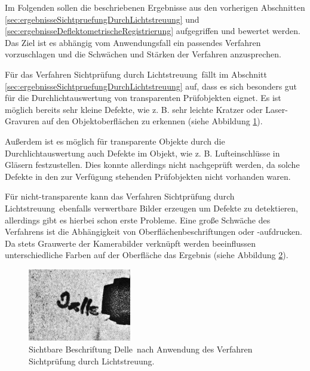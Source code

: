 Im Folgenden sollen die beschriebenen Ergebnisse aus den vorherigen Abschnitten \ref{sec:ergebnisseSichtpruefungDurchLichtstreuung} und \ref{sec:ergebnisseDeflektometrischeRegistrierung} aufgegriffen und bewertet werden.
Das Ziel ist es abhängig vom Anwendungsfall ein passendes Verfahren vorzuschlagen und die Schwächen und Stärken der Verfahren anzusprechen.

\p
Für das Verfahren \glqq Sichtprüfung durch Lichtstreuung\grqq ~fällt im Abschnitt \ref{sec:ergebnisseSichtpruefungDurchLichtstreuung} auf, dass es sich besonders gut für die Durchlichtauswertung von transparenten Prüfobjekten eignet.
Es ist möglich bereits sehr kleine Defekte, wie z. B. sehr leichte Kratzer oder Laser-Gravuren auf den Objektoberflächen zu erkennen (siehe Abbildung \ref{tikz:abbErkennbareKleineDefekteLichtstreuung}).

{
	\begin{figure}[H]
		\centering
		
		\label{tikz:abbErkennbareKleineDefekteLichtstreuung}
	\end{figure}
}

\noindent
Außerdem ist es möglich für transparente Objekte durch die Durchlichtauswertung auch Defekte im Objekt, wie z. B. Lufteinschlüsse in Gläsern festzustellen.
Dies konnte allerdings nicht nachgeprüft werden, da solche Defekte in den zur Verfügung stehenden Prüfobjekten nicht vorhanden waren.

\p
Für nicht-transparente kann das Verfahren \glqq Sichtprüfung durch Lichtstreuung\grqq ~ebenfalls verwertbare Bilder erzeugen um Defekte zu detektieren, allerdings gibt es hierbei schon erste Probleme.
Eine große Schwäche des Verfahrens ist die Abhängigkeit von Oberflächenbeschriftungen oder -aufdrucken.
Da stets Grauwerte der Kamerabilder verknüpft werden beeinflussen unterschiedliche Farben auf der Oberfläche das Ergebnis (siehe Abbildung \ref{img:delleBeschriftung}).

{
	\begin{figure}[H]
		\centering
		\includegraphics[width=0.4\textwidth]{05_ergebnisse/ergDiskussion/figures/delleBeschriftung}
		\caption[Sichtbare Beschriftung nach Anwendung des Verfahrens aus Kapitel \ref{chp:sichtpruefungDurchLichtstreuung}]{Sichtbare Beschriftung \glqq Delle\grqq ~nach Anwendung des Verfahren \glqq Sichtprüfung durch Lichtstreuung\grqq.}
		\label{img:delleBeschriftung}
	\end{figure}
}